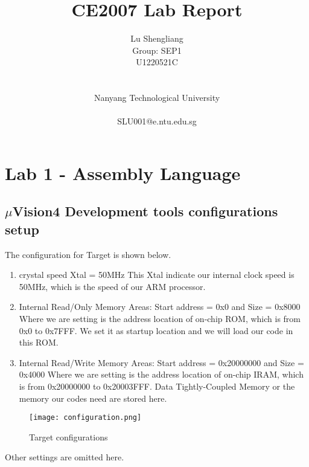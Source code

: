 \documentclass[11pt,fleqn]{article}
\title{CE2007 Lab Report}
\author{
  Lu Shengliang \\
  Group: SEP1 \\
  U1220521C \\
  \Organization{} \\
  \vspace*{-10mm} \\
  Nanyang Technological University \\
  \vspace*{-10mm} \\
  SLU001@e.ntu.edu.sg
}
\begin{document}
\maketitle



\section{Lab 1 - Assembly Language}

\subsection{$\mu$Vision4 Development tools configurations setup}
The configuration for Target is shown below.
\begin{enumerate}
  \item crystal speed Xtal = 50MHz
    This Xtal indicate our internal clock speed is 50MHz, which is the speed of our ARM processor.
  \item Internal Read/Only Memory Areas: Start address = 0x0 and Size = 0x8000
    Where we are setting is the address location of on-chip ROM, which is from 0x0 to 0x7FFF. We set it as startup location and we will load our code in this ROM.
  \item Internal Read/Write Memory Areas: Start address = 0x20000000 and Size = 0x4000
    Where we are setting is the address location of on-chip IRAM, which is from 0x20000000 to 0x20003FFF. Data Tightly-Coupled Memory or the memory our codes need are stored here.
\end{enumerate}
\begin{figure}[H]
\centering
\texttt{[image: configuration.png]}
\caption{Target configurations}
\end{figure}

Other settings are omitted here.

\end{document}
